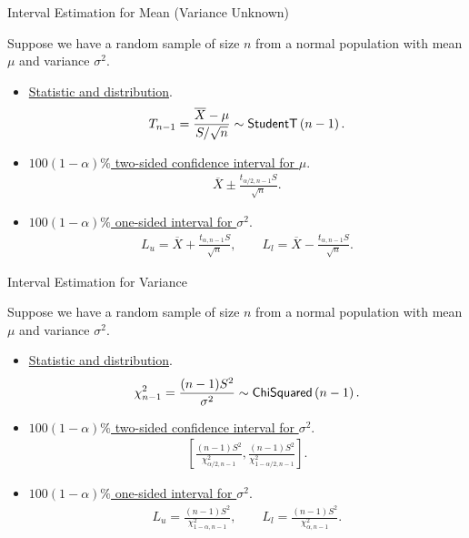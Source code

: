 \begin{frame}{Interval Estimation for Mean (Variance Unknown)}

\justifying
{} Suppose we have a random sample of size $n$ from a normal population with  mean $\mu$ and  variance $\sigma^2$.
\begin{itemize}
	\item \underline{Statistic and distribution}.
	\begin{align*}
	T_{n-1} = \frac{\overline{X} - \mu}{S/\sqrt{n}} \sim \mathsf{StudentT}\left(n-1 \right).
	\end{align*}
	\item \underline{$100(1-\alpha)\%$ two-sided confidence interval for $\mu$}.
	\begin{align*}
	\overline{X} \pm \frac{t_{\alpha/2, n-1} S}{\sqrt{n}}.
	\end{align*}
	\item \underline{$100(1-\alpha)\%$ one-sided interval for $\sigma^2$}.
	\begin{align*}
	L_u = \overline{X} + \frac{t_{\alpha, n-1}S}{\sqrt{n}}, \qquad L_l = \overline{X} - \frac{t_{\alpha, n-1}S}{\sqrt{n}}.
	\end{align*}
\end{itemize}

\end{frame}


\begin{frame}{Interval Estimation for Variance}

\justifying
{} Suppose we have a random sample of size $n$ from a normal population with  mean $\mu$ and  variance $\sigma^2$.
\begin{itemize}
	\item \underline{Statistic and distribution}.
	\begin{align*}
	\chi_{n-1}^2 = \frac{(n-1)S^2}{\sigma^2} \sim \mathsf{ChiSquared}\left(n-1 \right).
	\end{align*}
	\item \underline{$100(1-\alpha)\%$ two-sided confidence interval for $\sigma^2$}.
	\begin{align*}
	\left[\frac{(n-1)S^2}{\chi_{\alpha/2, n-1}^2}, \frac{(n-1)S^2}{\chi_{1-\alpha/2, n-1}^2} \right].
	\end{align*}
	\item \underline{$100(1-\alpha)\%$ one-sided interval for $\sigma^2$}.
	\begin{align*}
	L_u = \frac{(n-1)S^2}{\chi_{1-\alpha, n-1}^2}, \qquad L_l = \frac{(n-1)S^2}{\chi_{\alpha, n-1}^2}.
	\end{align*}
\end{itemize}

\end{frame}


